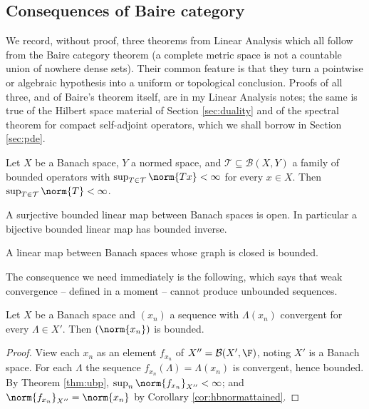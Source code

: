 \subsection{Consequences of Baire category}

We record, without proof, three theorems from Linear Analysis which all follow from the Baire category theorem (a complete metric space is not a countable union of nowhere dense sets). Their common feature is that they turn a pointwise or algebraic hypothesis into a uniform or topological conclusion. Proofs of all three, and of Baire's theorem itself, are in my Linear Analysis notes; the same is true of the Hilbert space material of Section \ref{sec:duality} and of the spectral theorem for compact self-adjoint operators, which we shall borrow in Section \ref{sec:pde}.

\begin{theorem}\label{thm:ubp}
	Let $X$ be a Banach space, $Y$ a normed space, and $\mathcal{T} \subseteq \mathcal{B}(X,Y)$ a family of bounded operators with $\sup_{T \in \mathcal{T}}\norm{Tx} < \infty$ for every $x \in X$. Then $\sup_{T\in\mathcal{T}}\norm{T} < \infty$.
\end{theorem}

\begin{theorem}\label{thm:omt}
	A surjective bounded linear map between Banach spaces is open. In particular a bijective bounded linear map has bounded inverse.
\end{theorem}

\begin{theorem}\label{thm:cgt}
	A linear map between Banach spaces whose graph is closed is bounded.
\end{theorem}

The consequence we need immediately is the following, which says that weak convergence -- defined in a moment -- cannot produce unbounded sequences.

\begin{proposition}\label{prop:weakbounded}
	Let $X$ be a Banach space and $(x_n)$ a sequence with $\Lambda(x_n)$ convergent for every $\Lambda \in X'$. Then $(\norm{x_n})$ is bounded.
\end{proposition}

\begin{proof}
	View each $x_n$ as an element $f_{x_n}$ of $X'' = \mathcal{B}(X', \F)$, noting $X'$ is a Banach space. For each $\Lambda$ the sequence $f_{x_n}(\Lambda) = \Lambda(x_n)$ is convergent, hence bounded. By Theorem \ref{thm:ubp}, $\sup_n \norm{f_{x_n}}_{X''} < \infty$; and $\norm{f_{x_n}}_{X''} = \norm{x_n}$ by Corollary \ref{cor:hbnormattained}.
\end{proof}


